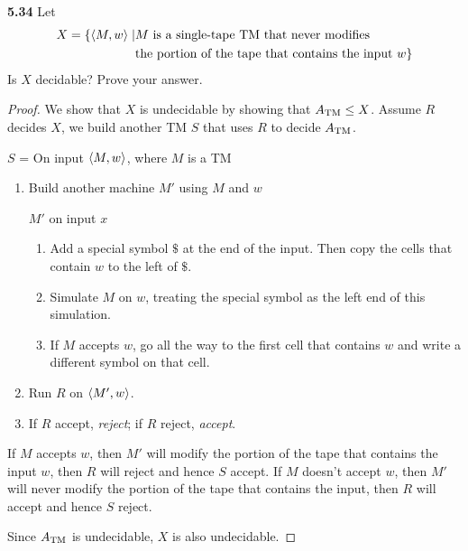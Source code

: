 \textbf{5.34} Let 
\begin{align*}
X = \{\langle{M, w}\rangle \mid & \text{$M$ is a single-tape TM that never modifies } \\
& \text{the portion of the tape that contains the input $w$}\}
\end{align*}
Is $X$ decidable? Prove your answer.
\begin{mdframed}
\begin{proof}
We show that $X$ is undecidable by showing that $A_{\text{TM}} \leq X$. Assume $R$ decides $X$, we build another TM $S$ that uses $R$ to decide $A_{\text{TM}}$.

\medskip
$S$ = On input $\langle{M, w}\rangle$, where $M$ is a TM
\begin{enumerate}
\item Build another machine $M'$ using $M$ and $w$

$M'$ on input $x$
\begin{enumerate}
\item Add a special symbol $\$$ at the end of the input. Then copy the cells that contain $w$ to the left of $\$$.
\item Simulate $M$ on $w$, treating the special symbol as the left end of this simulation. 
\item If $M$ accepts $w$, go all the way to the first cell that contains $w$ and write a different symbol on that cell.
\end{enumerate}
\item Run $R$ on $\langle{M', w}\rangle$.
\item If $R$ accept, \textit{reject}; if $R$ reject, \textit{accept}.
\end{enumerate}

If $M$ accepts $w$, then $M'$ will modify the portion of the tape that contains the input $w$, then $R$ will reject and hence $S$ accept. If $M$ doesn't accept $w$, then $M'$ will never modify the portion of the tape that contains the input, then $R$ will accept and hence $S$ reject.

\medskip
Since $A_{\text{TM}}$ is undecidable, $X$ is also undecidable.
\end{proof}
\end{mdframed}